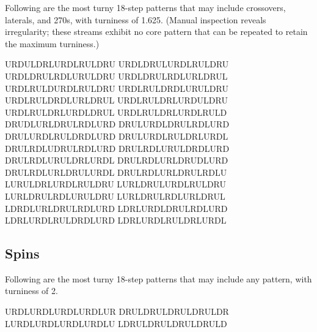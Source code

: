 \documentclass[10pt]{sigplanconf}
\begin{document}
Following are the most turny 18-step patterns that may include crossovers, laterals, and 270s, with turniness of 1.625.
(Manual inspection reveals irregularity; these streams exhibit no core pattern that can be repeated to retain the maximum turniness.)

\noindent
URDULDRLURDLRULDRU
URDLDRULURDLRULDRU
URDLDRULRDLURULDRU
URDLDRULRDLURLDRUL
URDLRULDURDLRULDRU
URDLRULDRDLURULDRU
URDLRULDRDLURLDRUL
URDLRULDRLURDULDRU
URDLRULDRLURDLDRUL
URDLRULDRLURDLRULD
DRUDLURLDRULRDLURD
DRULURDLDRULRDLURD
DRULURDLRULDRDLURD
DRULURDLRULDRLURDL
DRULRDLUDRULRDLURD
DRULRDLURULDRDLURD
DRULRDLURULDRLURDL
DRULRDLURLDRUDLURD
DRULRDLURLDRULURDL
DRULRDLURLDRULRDLU
LURULDRLURDLRULDRU
LURLDRULURDLRULDRU
LURLDRULRDLURULDRU
LURLDRULRDLURLDRUL \\
LDRDLURLDRULRDLURD
LDRLURDLDRULRDLURD
LDRLURDLRULDRDLURD
LDRLURDLRULDRLURDL

\subsection{Spins}

Following are the most turny 18-step patterns that may include any pattern, with turniness of 2.

\noindent
URDLURDLURDLURDLUR
DRULDRULDRULDRULDR
LURDLURDLURDLURDLU
LDRULDRULDRULDRULD
\end{document}

